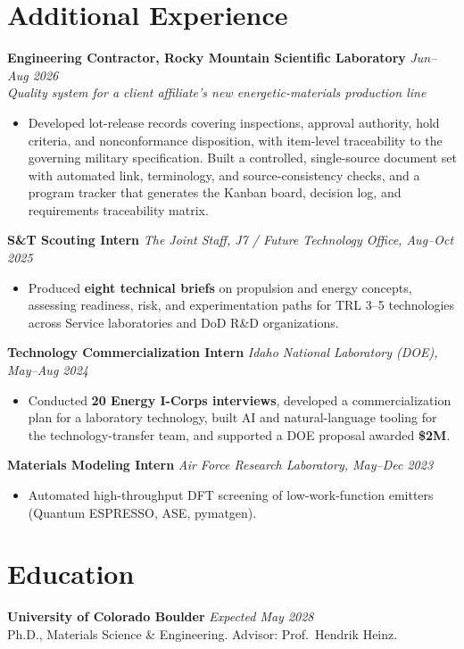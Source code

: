 \documentclass[letterpaper,10pt]{article}
\newcommand{\keep}{\needspace{4\baselineskip}}
\newcommand{\keepsection}{\needspace{6\baselineskip}}
\begin{document}
\keepsection\section*{Additional Experience}
\textbf{Engineering Contractor, Rocky Mountain Scientific Laboratory} \hfill \textit{Jun--Aug 2026}\\
\textit{Quality system for a client affiliate's new energetic-materials production line}
\begin{itemize}
    \item Developed lot-release records covering inspections, approval authority, hold criteria, and nonconformance disposition, with item-level traceability to the governing military specification. Built a controlled, single-source document set with automated link, terminology, and source-consistency checks, and a program tracker that generates the Kanban board, decision log, and requirements traceability matrix.
\end{itemize}

\keep\textbf{S\&T Scouting Intern} \hfill \textit{The Joint Staff, J7 / Future Technology Office, Aug--Oct 2025}
\begin{itemize}
    \item Produced \textbf{eight technical briefs} on propulsion and energy concepts, assessing readiness, risk, and experimentation paths for TRL 3--5 technologies across Service laboratories and DoD R\&D organizations.
\end{itemize}

\keep\textbf{Technology Commercialization Intern} \hfill \textit{Idaho National Laboratory (DOE), May--Aug 2024}
\begin{itemize}
    \item Conducted \textbf{20 Energy I-Corps interviews}, developed a commercialization plan for a laboratory technology, built AI and natural-language tooling for the technology-transfer team, and supported a DOE proposal awarded \textbf{\$2M}.
\end{itemize}

\keep\textbf{Materials Modeling Intern} \hfill \textit{Air Force Research Laboratory, May--Dec 2023}
\begin{itemize}
    \item Automated high-throughput DFT screening of low-work-function emitters (Quantum ESPRESSO, ASE, pymatgen).
\end{itemize}

\keepsection\section*{Education}
\textbf{University of Colorado Boulder} \hfill \textit{Expected May 2028}\\
Ph.D., Materials Science \& Engineering. Advisor: Prof.\ Hendrik Heinz.
\end{document}
